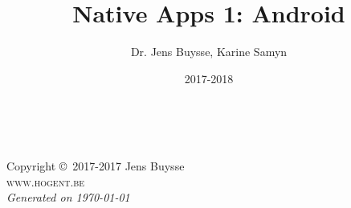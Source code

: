 \documentclass[11pt,fleqn,a4paper]{book}
\author{Dr. Jens Buysse, Karine Samyn}
\title{Native Apps 1: Android}
\date{2017-2018}
\begin{document}
\thetitlepage


\newpage
~\vfill
\thispagestyle{empty}

\noindent Copyright \copyright\ 2017-2017 Jens Buysse\\ %

\noindent \textsc{www.hogent.be}\\ %

\noindent \textit{Generated on \today} %



\tableofcontents %

\cleardoublepage %

\setlength{\parindent}{0pt}














\printbibliography

\printindex
\end{document}
